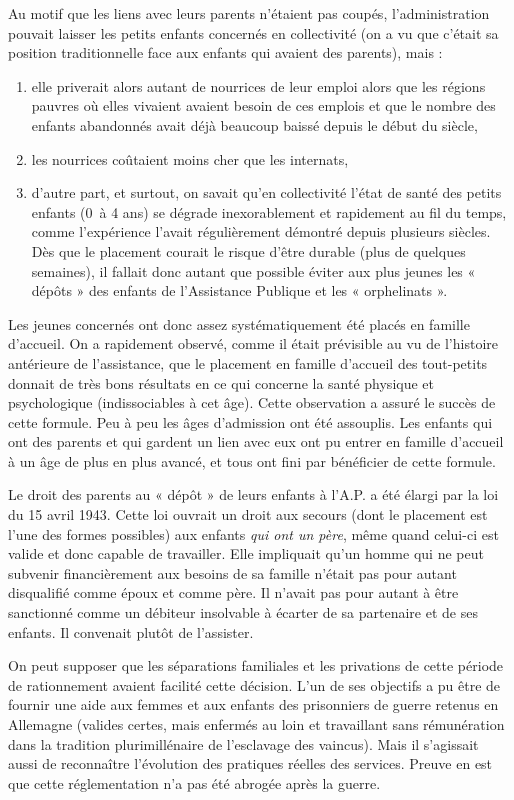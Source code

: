  Au motif que les liens avec leurs parents n'étaient pas coupés, l'administration pouvait laisser les petits enfants concernés en collectivité (on a vu que c'était sa position traditionnelle face aux enfants qui avaient des parents), mais :
\begin{enumerate}
\item elle priverait alors autant de nourrices de leur emploi alors que les régions pauvres où elles vivaient avaient besoin de ces emplois et que le nombre des enfants abandonnés avait déjà beaucoup baissé depuis le début du siècle,
\item les nourrices coûtaient moins cher que les internats,
\item d'autre part, et surtout, on savait qu'en collectivité l'état de santé des petits enfants (0~à 4 ans) se dégrade inexorablement et rapidement au fil du temps, comme l'expérience l'avait régulièrement démontré depuis plusieurs siècles. Dès que le placement courait le risque d'être durable (plus de quelques semaines), il fallait donc autant que possible éviter aux plus jeunes les « dépôts » des enfants de l'Assistance Publique et les « orphelinats ».
\end{enumerate}
 Les jeunes concernés ont donc assez systématiquement été placés en famille d'accueil. On a rapidement observé, comme il était prévisible au vu de l'histoire antérieure de l'assistance, que le placement en famille d'accueil des tout-petits donnait de très bons résultats en ce qui concerne la santé physique et psychologique (indissociables à cet âge). Cette observation a assuré le succès de cette formule. Peu à peu les âges d'admission ont été assouplis. Les enfants qui ont des parents et qui gardent un lien avec eux ont pu entrer en famille d'accueil à un âge de plus en plus avancé, et tous ont fini par bénéficier de cette formule. 

 Le droit des parents au « dépôt » de leurs enfants à l'A.P. a été élargi par la loi du 15 avril 1943. Cette loi ouvrait un droit aux secours (dont le placement est l'une des formes possibles) aux enfants \emph{qui ont un père}, même quand celui-ci est valide et donc capable de travailler. Elle impliquait qu'un homme qui ne peut subvenir financièrement aux besoins de sa famille n'était pas pour autant disqualifié comme époux et comme père. Il n'avait pas pour autant à être sanctionné comme un débiteur insolvable à écarter de sa partenaire et de ses enfants. Il convenait plutôt de l'assister.

 On peut supposer que les séparations familiales et les privations de cette période de rationnement avaient facilité cette décision. L'un de ses objectifs a pu être de fournir une aide aux femmes et aux enfants des prisonniers de guerre retenus en Allemagne (valides certes, mais enfermés au loin et travaillant sans rémunération dans la tradition plurimillénaire de l'esclavage des vaincus). Mais il s'agissait aussi de reconnaître l'évolution des pratiques réelles des services. Preuve en est que cette réglementation n'a pas été abrogée après la guerre. 

